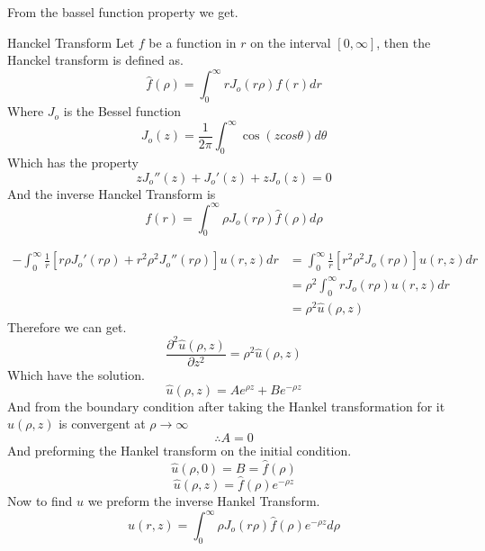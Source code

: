 \documentclass[]{article}
\begin{document}
From the bassel function property we get.
\begin{enrichment*}{Hanckel Transform}
    Let $f$ be a function in $r$ on the interval $[0,\infty]$, then the Hanckel transform is defined as.
    \[
        \hat{f}(\rho) = \int_{0}^{\infty} r J_o(r\rho) f(r) dr    
    \]
    Where $J_o$ is the Bessel function 
    \[
        J_o(z) = \frac{1}{2\pi}\int_{0}^{\infty} \cos(zcos\theta)d\theta     
    \]
    Which has the property 
    \[
        z J_o''(z) + J_o'(z)+ zJ_o(z) = 0     
    \]
    And the inverse Hanckel Transform is 
    \[
        f(r) = \int_{0}^{\infty} \rho J_o(r\rho) \hat{f}(\rho) d\rho    
    \]
\end{enrichment*}
\begin{align*}
- \int_{0}^{\infty} \frac{1}{r}\left[r\rho J_o'(r\rho)+ r^2\rho^2 J_o''(r\rho)\right] u(r,z)dr &= \int_{0}^{\infty} \frac{1}{r}\left[r^2\rho^2 J_o(r\rho)\right] u(r,z)dr
\\
&= \rho^2 \int_{0}^{\infty} r J_o(r\rho) u(r,z)dr
\\
&= \rho^2 \hat{u}(\rho,z)
\end{align*}
Therefore we can get.
\[
    \frac{\partial^2 \hat{u}(\rho,z)}{\partial z^2} = \rho^2 \hat{u}(\rho,z)    
\]
Which have the solution. 
\[
\hat{u}(\rho,z) = A e^{\rho z} + Be^{-\rho z}    
\]
And from the boundary condition after taking the Hankel transformation for it $\hat{u}(\rho,z)$ is convergent at $\rho \to \infty$
\[
\therefore A = 0    
\]
And preforming the Hankel transform on the initial condition.
\[
\hat{u}(\rho,0) = B = \hat{f}(\rho)    
\]
\[
\hat{u}(\rho,z) = \hat{f}(\rho)e^{-\rho z}    
\]
Now to find $u$ we preform the inverse Hankel Transform.
\[
u(r,z) = \int_{0}^{\infty} \rho J_o(r\rho)\hat{f}(\rho)e^{-\rho z} d\rho    
\]

\newpage
\setcounter{equation}{0}
\end{document}
